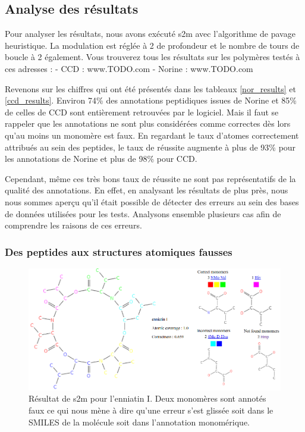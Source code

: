 \subsection{Analyse des résultats}

Pour analyser les résultats, nous avons exécuté s2m avec l'algorithme de pavage heuristique.
La modulation est réglée à 2 de profondeur et le nombre de tours de boucle à 2 également.
Vous trouverez tous les résultats sur les polymères testés à ces adresses :
- CCD : www.TODO.com
- Norine : www.TODO.com


Revenons sur les chiffres qui ont été présentés dans les tableaux \ref{nor_results} et \ref{ccd_results}.
Environ 74\% des annotations peptidiques issues de Norine et 85\% de celles de CCD sont entièrement retrouvées par le logiciel.
Mais il faut se rappeler que les annotations ne sont plus considérées comme correctes dès lors qu'au moins un monomère est faux.
En regardant le taux d'atomes correctement attribués au sein des peptides, le taux de réussite augmente à plus de 93\% pour les annotations de Norine et plus de 98\% pour CCD.

Cependant, même ces très bons taux de réussite ne sont pas représentatifs de la qualité des annotations.
En effet, en analysant les résultats de plus près, nous nous sommes aperçu qu'il était possible de détecter des erreurs au sein des bases de données utilisées pour les tests.
Analysons ensemble plusieurs cas afin de comprendre les raisons de ces erreurs.


\subsubsection{Des peptides aux structures atomiques fausses}

\begin{figure}[!ht]
  \begin{center}
    \includegraphics[width=450px]{Figures/s2m/results/s2m_enniati.png}
    \caption{\label{s2m_enniati}Résultat de s2m pour l'enniatin I.
    Deux monomères sont annotés faux ce qui nous mène à dire qu'une erreur s'est glissée soit dans le SMILES de la molécule soit dans l'annotation monomérique.}
  \end{center}
\end{figure}

